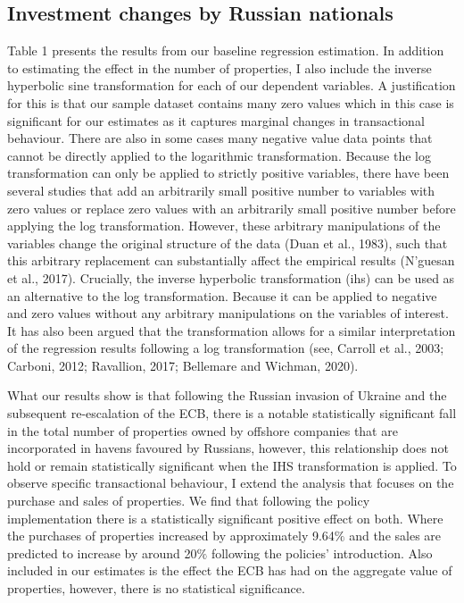 \documentclass{article}
\begin{document}
\subsection{Investment changes by Russian nationals}
Table 1 presents the results from our baseline regression estimation. In addition to estimating the effect in the number of properties, I also include the inverse hyperbolic sine transformation for each of our dependent variables. A justification for this is that our sample dataset contains many zero values which in this case is significant for our estimates as it captures marginal changes in transactional behaviour. There are also in some cases many negative value data points that cannot be directly applied to the logarithmic transformation. Because the log transformation can only be applied to strictly positive variables, there have been several studies that add an arbitrarily small positive number to variables with zero values or replace zero values with an arbitrarily small positive number before applying the log transformation. However, these arbitrary manipulations of the variables change the original structure of the data (Duan et al., 1983), such that this arbitrary replacement can substantially affect the empirical results (N’guesan et al., 2017). Crucially, the inverse hyperbolic transformation (ihs) can be used as an alternative to the log transformation. Because it can be applied to negative and zero values without any arbitrary manipulations on the variables of interest. It has also been argued that the transformation allows for a similar interpretation of the regression results following a log transformation (see, Carroll et al., 2003; Carboni, 2012; Ravallion, 2017; Bellemare and Wichman, 2020). 

What our results show is that following the Russian invasion of Ukraine and the subsequent re-escalation of the ECB, there is a notable statistically significant fall in the total number of properties owned by offshore companies that are incorporated in havens favoured by Russians, however, this relationship does not hold or remain statistically significant when the IHS transformation is applied. To observe specific transactional behaviour, I extend the analysis that focuses on the purchase and sales of properties. We find that following the policy implementation there is a statistically significant positive effect on both. Where the purchases of properties increased by approximately 9.64${\%}$ and the sales are predicted to increase by around 20${\%}$ following the policies’ introduction. Also included in our estimates is the effect the ECB has had on the aggregate value of properties, however, there is no statistical significance.
\end{document}
